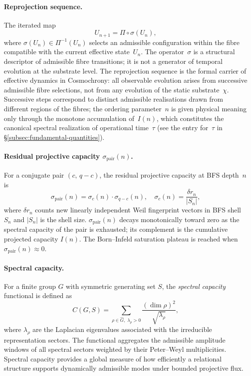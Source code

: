   \paragraph{Reprojection sequence.}
    The iterated map
    \[
      U_{n+1} = \Pi \circ \sigma(U_n),
    \]
    where $\sigma(U_n) \in \Pi^{-1}(U_n)$ selects an admissible configuration
    within the fibre compatible with the current effective state~$U_n$.
    The operator~$\sigma$ is a structural descriptor of admissible fibre
    transitions; it is not a generator of temporal evolution at the substrate
    level.
    The reprojection sequence is the formal carrier of effective dynamics in
    Cosmochrony: all observable evolution arises from successive admissible
    fibre selections, not from any evolution of the static substrate~$\chi$.
    Successive steps correspond to distinct admissible realisations drawn from
    different regions of the fibres; the ordering parameter~$n$ is given
    physical meaning only through the monotone accumulation of~$I(n)$,
    which constitutes the canonical spectral realization of operational
    time~$\tau$ (see the entry for~$\tau$ in \S\ref{subsec:fundamental-quantities}).

  \paragraph{Residual projective capacity \texorpdfstring{$\sigma_{\mathrm{pair}}(n)$}{σpair(n)}.}
    For a conjugate pair $(c,\,q-c)$, the residual projective capacity at BFS
    depth~$n$ is
    \[
      \sigma_{\mathrm{pair}}(n)
      = \sigma_c(n)\cdot\sigma_{q-c}(n),
      \quad
      \sigma_c(n) = \frac{\delta r_n}{|S_n|},
    \]
    where $\delta r_n$ counts new linearly independent Weil fingerprint vectors
    in BFS shell~$S_n$ and $|S_n|$ is the shell size.
    $\sigma_{\mathrm{pair}}(n)$ decays monotonically toward zero as the spectral
    capacity of the pair is exhausted; its complement is the cumulative projected
    capacity $I(n)$.
    The Born--Infeld saturation plateau is reached when $\sigma_{\mathrm{pair}}(n)
\approx 0$.

  \paragraph{Spectral capacity.}
    For a finite group $G$ with symmetric generating set $S$, the
    \emph{spectral capacity} functional is defined as
    \[
      C(G,S) =
      \sum_{\rho \in \widehat G,\; \lambda_\rho > 0}
      \frac{(\dim \rho)^2}{\sqrt{\lambda_\rho}},
    \]
    where $\lambda_\rho$ are the Laplacian eigenvalues associated with the irreducible
    representation sectors.
    The functional aggregates the admissible amplitude windows of all spectral sectors
    weighted by their Peter--Weyl multiplicities.
    Spectral capacity provides a global measure of how efficiently a relational structure
    supports dynamically admissible modes under bounded projective flux.

